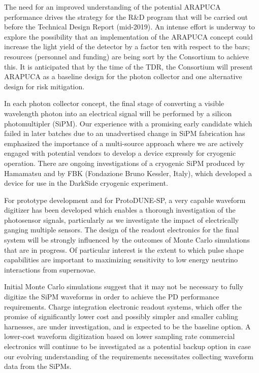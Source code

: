 The need for an improved understanding of the potential ARAPUCA performance drives the strategy for the R\&D program that will be carried out before the Technical Design Report (mid-2019). An intense effort 
is underway to explore the possibility that an implementation of the ARAPUCA concept could increase the light yield of the 
detector by a factor ten with respect to the bars; resources (personnel and funding) are being sort by the Consortium to achieve this.  
It is anticipated that by the time of the TDR, the Consortium will present ARAPUCA as a baseline design for the photon collector and one alternative design for risk mitigation.  

In each photon collector concept, the final stage of converting a visible wavelength photon into an electrical signal will be performed by a silicon photomultipler (SiPM). Our experience with a promising early candidate which failed in later batches due to an unadvertised change in SiPM fabrication has emphasized the importance of a multi-source approach where we are actively engaged with potential vendors to develop a device expressly for cryogenic operation. There are ongoing investigations of a cryogenic SiPM produced by Hamamatsu and by FBK (Fondazione Bruno Kessler, Italy), which developed a device for use in the DarkSide cryogenic experiment.

For prototype development and for ProtoDUNE-SP, a very capable waveform digitizer has been developed which enables a thorough investigation of the photosensor signals, particularly as we investigate the impact of electrically ganging multiple sensors. The design of the readout electronics for the final system will be strongly influenced by the outcomes of Monte Carlo simulations that are in progress. Of particular interest is the extent to which pulse  shape capabilities are important to maximizing sensitivity to low energy neutrino interactions from supernovae. 


Initial Monte Carlo simulations suggest that it may not be necessary to fully digitize the SiPM waveforms in order to achieve the PD performance requirements.  Charge integration electronic readout systems, which offer the promise of significantly lower cost and possibly simpler and smaller cabling harnesses, are under investigation, and is expected to be the baseline option.
A lower-cost waveform digitization based on lower sampling rate commercial electronics will continue to be investigated as a potential backup option in case our evolving understanding of the requirements necessitates collecting waveform data from the SiPMs.

